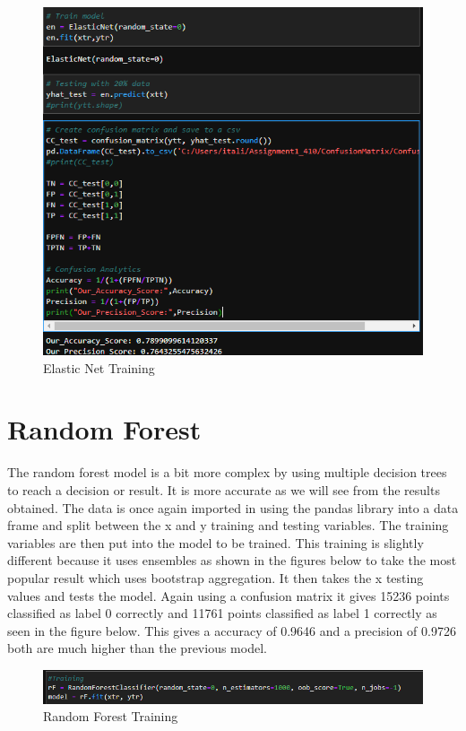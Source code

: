 \documentclass[conference]{IEEEtran}
\begin{document}
\begin{figure}[h]
  \centering
  \includegraphics[width=\linewidth]{elasticNetTraining.png}
  \caption{Elastic Net Training}
\end{figure}

\section{Random Forest}
The random forest model is a bit more complex by using multiple decision trees to reach a decision or result. It is more accurate as we will see from the results obtained. The data is once again imported in using the pandas library into a data frame and split between the x and y training and testing variables. The training variables are then put into the model to be trained. This training is slightly different because it uses ensembles as shown in the figures below to take the most popular result which uses bootstrap aggregation. It then takes the x testing values and tests the model. Again using a confusion matrix it gives 15236 points classified as label 0 correctly and 11761 points classified as label 1 correctly as seen in the figure below. This gives a accuracy of 0.9646 and a precision of 0.9726 both are much higher than the previous model.

\begin{figure}[h]
  \centering
  \includegraphics[width=\linewidth]{RFT.png}
  \caption{Random Forest Training}
\end{figure}
\end{document}
